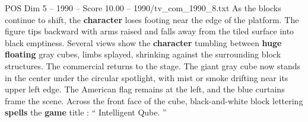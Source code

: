 \begin{textsample}{POS Dim 5 – 1990 – Score 10.00 – 1990/tv\_com\_1990\_8.txt}
As the blocks continue to shift, the \textbf{character} loses footing near the edge of the platform.
The figure tips backward with arms raised and falls away from the tiled surface into black emptiness.
Several views show the \textbf{character} tumbling between \textbf{huge} \textbf{floating} gray cubes, limbs splayed, shrinking against the surrounding block structures.
The commercial returns to the stage.
The giant gray cube now stands in the center under the circular spotlight, with mist or smoke drifting near its upper left edge.
The American flag remains at the left, and the blue curtains frame the scene.
Across the front face of the cube, black-and-white block lettering \textbf{spells} the \textbf{game} title : “ Intelligent Qube. ”

\end{textsample}
